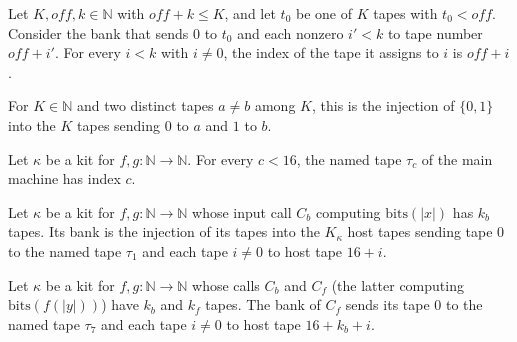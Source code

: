 \begin{theorem}
\label{Turing.NTimeDiag.qyBank_val}
\leanok
{}
Let $K, \mathit{off}, k \in \mathbb{N}$ with $\mathit{off} + k \le K$, and let $t_0$ be one of $K$
tapes with $t_0 < \mathit{off}$. Consider the bank that sends $0$ to $t_0$ and each nonzero
$i' < k$ to tape number $\mathit{off} + i'$. For every $i < k$ with $i \ne 0$, the index of the
tape it assigns to $i$ is $\mathit{off} + i$.
\end{theorem}

\begin{definition}
\label{Turing.NTimeDiag.qyEmb2}
\leanok
For $K \in \mathbb{N}$ and two distinct tapes $a \ne b$ among $K$, this is the injection of
$\{0, 1\}$ into the $K$ tapes sending $0$ to $a$ and $1$ to $b$.
\end{definition}

\begin{theorem}
\label{Turing.NTimeDiag.QyKit.tp_val}
\leanok
{}
Let $\kappa$ be a kit for $f, g : \mathbb{N} \to \mathbb{N}$. For every $c < 16$, the named tape
$\tau_c$ of the main machine has index $c$.
\end{theorem}

\begin{definition}
\label{Turing.NTimeDiag.QyKit.bCb}
\leanok
{}
Let $\kappa$ be a kit for $f, g : \mathbb{N} \to \mathbb{N}$ whose input call $C_b$ computing
$\mathrm{bits}(|x|)$ has $k_b$ tapes. Its bank is the injection of its tapes into the $K_\kappa$
host tapes sending tape $0$ to the named tape $\tau_1$ and each tape $i \ne 0$ to host tape
$16 + i$.
\end{definition}

\begin{definition}
\label{Turing.NTimeDiag.QyKit.bCf}
\leanok
{}
Let $\kappa$ be a kit for $f, g : \mathbb{N} \to \mathbb{N}$ whose calls $C_b$ and $C_f$ (the
latter computing $\mathrm{bits}(f(|y|))$) have $k_b$ and $k_f$ tapes. The bank of $C_f$ sends its
tape $0$ to the named tape $\tau_7$ and each tape $i \ne 0$ to host tape $16 + k_b + i$.
\end{definition}


